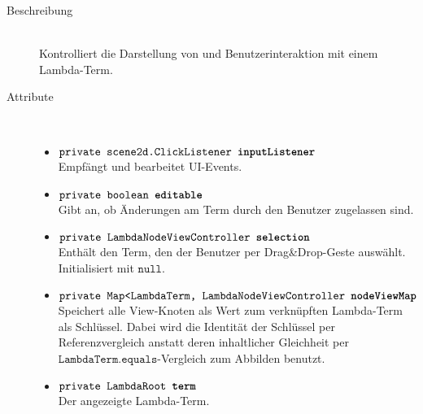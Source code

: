 \begin{description}
\item[Beschreibung] \hfill \\ Kontrolliert die Darstellung von und Benutzerinteraktion mit einem Lambda-Term.

\item[Attribute] \hfill \\
	\vspace{-.8cm}
	\begin{itemize}
		\item $\texttt{private scene2d.ClickListener \textbf{inputListener}}$ \\ Empfängt und bearbeitet UI-Events.
		\item $\texttt{private boolean \textbf{editable}}$ \\ Gibt an, ob Änderungen am Term durch den Benutzer zugelassen sind.
		\item $\texttt{private LambdaNodeViewController \textbf{selection}}$ \\ Enthält den Term, den der Benutzer per Drag\&Drop-Geste auswählt. Initialisiert mit $\texttt{null}$.
		\item $\texttt{private Map<LambdaTerm, LambdaNodeViewController \textbf{nodeViewMap}}$ \\ Speichert alle View-Knoten als Wert zum verknüpften Lambda-Term als Schlüssel. Dabei wird die Identität der Schlüssel per Referenzvergleich anstatt deren inhaltlicher Gleichheit per $\texttt{LambdaTerm.equals}$-Vergleich zum Abbilden benutzt.
		\item $\texttt{private LambdaRoot \textbf{term}}$ \\ Der angezeigte Lambda-Term.
	\end{itemize}
	

\end{description}
